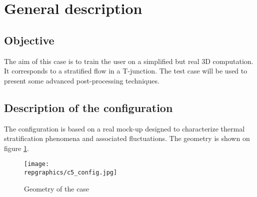 %
%
%
%
%
%
%
\section{General description}

        \subsection{Objective}

The aim of this case is to train the \CS user on a simplified but real 3D
computation. It corresponds to a stratified flow in a T-junction. The test case
will be used to present some advanced post-processing techniques.


        \subsection{Description of the configuration}

The configuration is based on a real mock-up designed to characterize thermal
stratification phenomena and associated fluctuations. The geometry is shown on
figure \ref{config}.


\begin{figure}[h!]
\begin{center}
\texttt{[image: \\repgraphics/c5\_config.jpg]}
\caption{Geometry of the case}
\label{config}
\end{center}
\end{figure}

